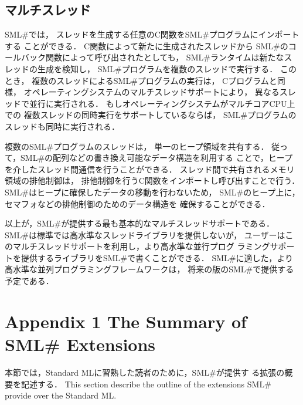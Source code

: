 \documentclass{jbook}
\newcommand{\txt}[2]{#2}
\newcommand{\smlsharp}{SML\#}
\begin{document}
\section{マルチスレッド}

	\smlsharp{}では，
スレッドを生成する任意のC関数を\smlsharp{}プログラムにインポートする
ことができる．
	C関数によって新たに生成されたスレッドから
\smlsharp{}のコールバック関数によって呼び出されたとしても，
\smlsharp{}ランタイムは新たなスレッドの生成を検知し，
\smlsharp{}プログラムを複数のスレッドで実行する．
	このとき，
複数のスレッドによる\smlsharp{}プログラムの実行は，
Cプログラムと同様，
オペレーティングシステムのマルチスレッドサポートにより，
異なるスレッドで並行に実行される．
	もしオペレーティングシステムがマルチコアCPU上での
複数スレッドの同時実行をサポートしているならば，
\smlsharp{}プログラムのスレッドも同時に実行される．

	複数の\smlsharp{}プログラムのスレッドは，
単一のヒープ領域を共有する．
	従って，\smlsharp{}の配列などの書き換え可能なデータ構造を利用する
ことで，ヒープを介したスレッド間通信を行うことができる．
	スレッド間で共有されるメモリ領域の排他制御は，
排他制御を行うC関数をインポートし呼び出すことで行う．
	\smlsharp{}はヒープに確保したデータの移動を行わないため，
\smlsharp{}のヒープ上に，セマフォなどの排他制御のためのデータ構造を
確保することができる．

	以上が，\smlsharp{}が提供する最も基本的なマルチスレッドサポートである．
	\smlsharp{}は標準では高水準なスレッドライブラリを提供しないが，
ユーザーはこのマルチスレッドサポートを利用し，より高水準な並行プログ
ラミングサポートを提供するライブラリを\smlsharp{}で書くことができる．
	\smlsharp{}に適した，より高水準な並列プログラミングフレームワークは，
将来の版の\smlsharp{}で提供する予定である．

% 
\ifjp%
\else%
\fi%

\chapter{\txt{付録１ \smlsharp{}の拡張概要}{Appendix 1 The Summary of \smlsharp{} Extensions}}
\ifjp%
	本節では，Standard MLに習熟した読者のために，\smlsharp{}が提供す
る拡張の概要を記述する．
\else%
	This section describe the outline of the extensions \smlsharp{}
provide over the Standard ML.
\fi%
\end{document}

